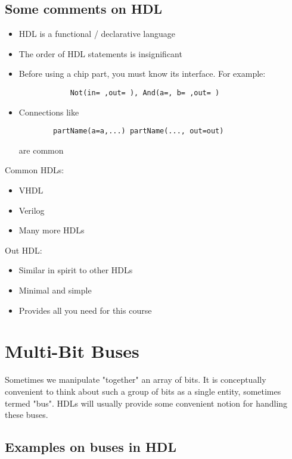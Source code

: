 \subsection{Some comments on HDL}

\begin{itemize}
    \item HDL is a functional / declarative language
    \item The order of HDL statements is insignificant
    \item Before using a chip part, you must know its interface.
        For example: 
        \begin{lstlisting}
            Not(in= ,out= ), And(a=, b= ,out= )
        \end{lstlisting}
    \item Connections like
        \begin{lstlisting}
        partName(a=a,...) partName(..., out=out)
        \end{lstlisting}
        are common
\end{itemize}

Common HDLs:

\begin{itemize}
    \item VHDL
    \item Verilog
    \item Many more HDLs
\end{itemize}

Out HDL:

\begin{itemize}
    \item Similar in spirit to other HDLs
    \item Minimal and simple
    \item Provides all you need for this course
\end{itemize}

\section{Multi-Bit Buses}

Sometimes we manipulate "together" an array of bits.
It is conceptually convenient to think about such a group of bits
as a single entity, sometimes termed "bus".
HDLs will usually provide some convenient notion for handling
these buses.

\subsection{Examples on buses in HDL}


